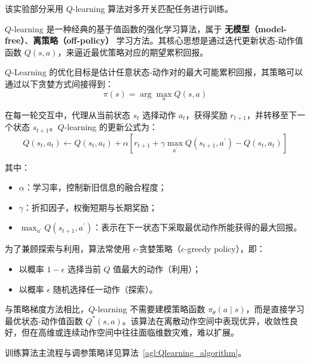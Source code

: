 该实验部分采用 \(Q\)-learning 算法对多开关匹配任务进行训练。

\(Q\)-learning 是一种经典的基于值函数的强化学习算法，属于 \textbf{无模型（model-free）}、\textbf{离策略（off-policy）} 学习方法。其核心思想是通过迭代更新状态-动作值函数 \(Q(s, a)\)，来逼近最优策略对应的期望累积回报。

\(Q\)-Learning 的优化目标是估计任意状态-动作对的最大可能累积回报，其策略可以通过以下贪婪方式间接得到：
\[
\pi(s) = \arg\max_a Q(s, a)
\]

在每一轮交互中，代理从当前状态 \(s_t\) 选择动作 \(a_t\)，获得奖励 \(r_{t+1}\)，并转移至下一个状态 \(s_{t+1}\)。\(Q\)-learning 的更新公式为：
\begin{equation}\label{eq:q-learning-update}
    Q(s_t, a_t) \leftarrow Q(s_t, a_t) + \alpha \left[ r_{t+1} + \gamma \max_{a^\prime} Q(s_{t+1}, a^\prime) - Q(s_t, a_t) \right]
\end{equation}

其中：
\begin{itemize}
    \item \(\alpha\)：学习率，控制新旧信息的融合程度；
    \item \(\gamma\)：折扣因子，权衡短期与长期奖励；
    \item \(\max_{a^\prime} Q(s_{t+1}, a^\prime)\)：表示在下一状态下采取最优动作所能获得的最大回报。
\end{itemize}

为了兼顾探索与利用，算法常使用 \(\epsilon\)-贪婪策略（\(\epsilon\)-greedy policy），即：
\begin{itemize}
    \item 以概率 \(1 - \epsilon\) 选择当前 \(Q\) 值最大的动作（利用）；
    \item 以概率 \(\epsilon\) 随机选择任一动作（探索）。
\end{itemize}

与策略梯度方法相比，\(Q\)-learning 不需要建模策略函数 \(\pi_\theta(a \mid s)\)，而是直接学习最优状态-动作值函数 \(Q^*(s, a)\)。该算法在离散动作空间中表现优异，收敛性良好，但在高维或连续动作空间中往往面临维数灾难，难以扩展。

训练算法主流程与调参策略详见算法~\ref{agl:Qlearning_algorithm}。

